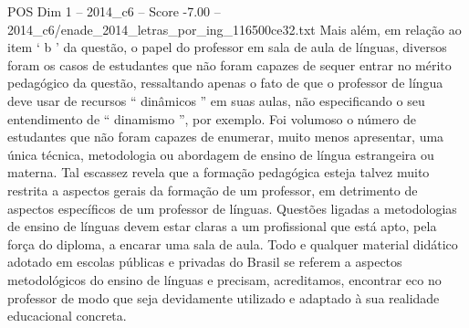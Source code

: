 \begin{textsample}{POS Dim 1 – 2014\_c6 – Score -7.00 – 2014\_c6/enade\_2014\_letras\_por\_ing\_116500ce32.txt}
Mais além, em relação ao item ‘ b ’ da questão, o papel do professor em sala de aula de línguas, diversos foram os casos de estudantes que não foram capazes de sequer entrar no mérito pedagógico da questão, ressaltando apenas o fato de que o professor de língua deve usar de recursos “ dinâmicos ” em suas aulas, não especificando o seu entendimento de “ dinamismo ”, por exemplo.
Foi volumoso o número de estudantes que não foram capazes de enumerar, muito menos apresentar, uma única técnica, metodologia ou abordagem de ensino de língua estrangeira ou materna.
Tal escassez revela que a formação pedagógica esteja talvez muito restrita a aspectos gerais da formação de um professor, em detrimento de aspectos específicos de um professor de línguas.
Questões ligadas a metodologias de ensino de línguas devem estar claras a um profissional que está apto, pela força do diploma, a encarar uma sala de aula.
Todo e qualquer material didático adotado em escolas públicas e privadas do Brasil se referem a aspectos metodológicos do ensino de línguas e precisam, acreditamos, encontrar eco no professor de modo que seja devidamente utilizado e adaptado à sua realidade educacional concreta.

\end{textsample}
